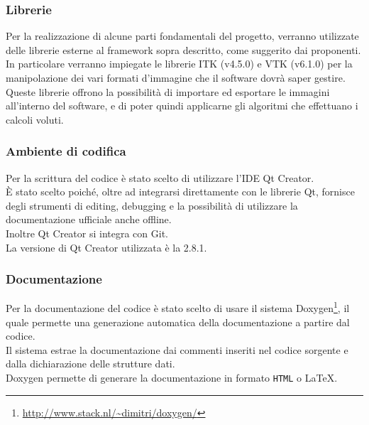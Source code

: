 \subsubsection{Librerie}
\label{librerie}
Per la realizzazione di alcune parti fondamentali del progetto, verranno utilizzate delle librerie esterne al framework\glossario{} sopra descritto, come suggerito dai proponenti. In particolare verranno impiegate le librerie ITK\glossario{} (v4.5.0) e VTK\glossario{} (v6.1.0) per la manipolazione dei vari formati d'immagine che il software dovrà saper gestire. Queste librerie offrono la possibilità di importare ed esportare le immagini all'interno del software, e di poter quindi applicarne gli algoritmi che effettuano i calcoli voluti. 

\subsubsection{Ambiente di codifica}
\label{ambientecodifica}
Per la scrittura del codice è stato scelto di utilizzare l'IDE\glossario{} Qt\glossario{} Creator.
\\È stato scelto poiché, oltre ad integrarsi direttamente con le librerie Qt\glossario{}, fornisce degli strumenti di editing, debugging e la possibilità di utilizzare la documentazione ufficiale anche offline.
\\Inoltre Qt\glossario{} Creator si integra con Git\glossario{}.
\\La versione di Qt\glossario{} Creator utilizzata è la 2.8.1.

\subsubsection{Documentazione}
\label{documentazione_codice}
Per la documentazione del codice è stato scelto di usare il sistema Doxygen\footnote{\url{http://www.stack.nl/~dimitri/doxygen/}}, il quale permette una generazione automatica della documentazione a partire dal codice.
\\Il sistema estrae la documentazione dai commenti inseriti nel codice sorgente e dalla dichiarazione delle strutture dati.
\\Doxygen permette di generare la documentazione in formato \verb!HTML! o \LaTeX.